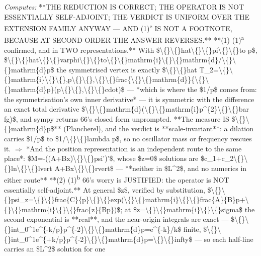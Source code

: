 \begin{description}
\emph{Computes:} **THE REDUCTION IS CORRECT; THE OPERATOR IS NOT ESSENTIALLY SELF-ADJOINT; THE VERDICT IS UNIFORM OVER THE EXTENSION FAMILY ANYWAY --- AND (1)\textsuperscript{c} IS NOT A FOOTNOTE, BECAUSE AT SECOND ORDER THE ANSWER REVERSES.**  **(1) (1)\textsuperscript{a} confirmed, and in TWO representations.** With \$\textbackslash\{\}\textbackslash\{\}hat\textbackslash\{\}\textbackslash\{\}pi\textbackslash\{\}\textbackslash\{\}to p\$, \$\textbackslash\{\}\textbackslash\{\}hat\textbackslash\{\}\textbackslash\{\}varphi\textbackslash\{\}\textbackslash\{\}to\textbackslash\{\}\textbackslash\{\}mathrm\{i\}\textbackslash\{\}\textbackslash\{\}mathrm\{d\}/\textbackslash\{\}\textbackslash\{\}mathrm\{d\}p\$ the symmetrised vertex is exactly \$\textbackslash\{\}\textbackslash\{\}hat T\_2=\textbackslash\{\}\textbackslash\{\}mathrm\{i\}\textbackslash\{\}\textbackslash\{\},p\textbackslash\{\}\textbackslash\{\},\textbackslash\{\}\textbackslash\{\}frac\{\textbackslash\{\}\textbackslash\{\}mathrm\{d\}\}\{\textbackslash\{\}\textbackslash\{\}mathrm\{d\}p\}(p\textbackslash\{\}\textbackslash\{\},\textbackslash\{\}\textbackslash\{\}cdot)\$ --- *which is where the \$1/p\$ comes from: the symmetrisation's own inner derivative* --- it is symmetric with the difference an exact total derivative \$\textbackslash\{\}\textbackslash\{\}mathrm\{d\}(\textbackslash\{\}\textbackslash\{\}mathrm\{i\}p\textasciicircum{}\{2\}\textbackslash\{\}\textbackslash\{\}bar fg)\$, and sympy returns 66's closed form unprompted. **The measure IS \$\textbackslash\{\}\textbackslash\{\}mathrm\{d\}p\$** (Plancherel), and the verdict is **scale-invariant**: a dilation carries \$1/p\$ to \$1/\textbackslash\{\}\textbackslash\{\}lambda p\$, so no oscillator mass or frequency rescues it. \ensuremath{\Rightarrow} *And the position representation is an independent route to the same place*: \$M=-((A+Bx)\textbackslash\{\}\textbackslash\{\}psi')'\$, whose \$z=0\$ solutions are \$c\_1+c\_2\textbackslash\{\}\textbackslash\{\}ln\textbackslash\{\}\textbackslash\{\}lvert A+Bx\textbackslash\{\}\textbackslash\{\}rvert\$ --- **neither in \$L\textasciicircum{}2\$, and no numerics in either route**  **(2) (1)\textsuperscript{b} 66's worry is JUSTIFIED: the operator is NOT essentially self-adjoint.** At general \$z\$, verified by substitution, \$\textbackslash\{\}\textbackslash\{\}psi\_z=\textbackslash\{\}\textbackslash\{\}frac\{C\}\{p\}\textbackslash\{\}\textbackslash\{\}exp(\textbackslash\{\}\textbackslash\{\}mathrm\{i\}\textbackslash\{\}\textbackslash\{\}frac\{A\}\{B\}p+\textbackslash\{\}\textbackslash\{\}mathrm\{i\}\textbackslash\{\}\textbackslash\{\}frac\{z\}\{Bp\})\$; at \$z=\textbackslash\{\}\textbackslash\{\}mathrm\{i\}\textbackslash\{\}\textbackslash\{\}sigma\$ the second exponential is **real**, and the near-origin integrals are exact --- \$\textbackslash\{\}\textbackslash\{\}int\_0\textasciicircum{}1e\textasciicircum{}\{-k/p\}p\textasciicircum{}\{-2\}\textbackslash\{\}\textbackslash\{\}mathrm\{d\}p=e\textasciicircum{}\{-k\}/k\$ finite, \$\textbackslash\{\}\textbackslash\{\}int\_0\textasciicircum{}1e\textasciicircum{}\{+k/p\}p\textasciicircum{}\{-2\}\textbackslash\{\}\textbackslash\{\}mathrm\{d\}p=\textbackslash\{\}\textbackslash\{\}infty\$ --- so each half-line carries an \$L\textasciicircum{}2\$ solution for one 
\end{description}
